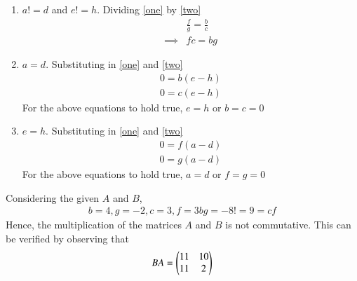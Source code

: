 \documentclass[journal,12pt,twocolumn]{IEEEtran}
\begin{document}
\begin{enumerate}
    \item $a!=d$ and $e!=h$.
    Dividing \eqref{one} by \eqref{two}
    \begin{align}
        &\frac{f}{g}=\frac{b}{c}\\
        \implies & fc=bg
    \end{align}
    \item $a=d.$
    Substituting in \eqref{one} and \eqref{two}
    \begin{align}
        0=b(e-h)\\
        0=c(e-h)
    \end{align}
    For the above equations to hold true, $e=h$ or $b=c=0$
    \item $e=h.$
    Substituting in \eqref{one} and \eqref{two}
    \begin{align}
        0=f(a-d)\\
        0=g(a-d)
    \end{align}
    For the above equations to hold true, $a=d$ or $f=g=0$
\end{enumerate}
Considering the given $A$ and $B$,
\begin{align}
    b=4,g=-2,c=3,f=3
    bg=-8!=9=cf
\end{align}
Hence, the multiplication of the matrices $A$ and $B$ is not commutative.
This can be verified by observing that
\begin{align}
    BA=\begin{pmatrix}11 & 10 \\ 11 & 2\end{pmatrix}
\end{align}
\end{document}
